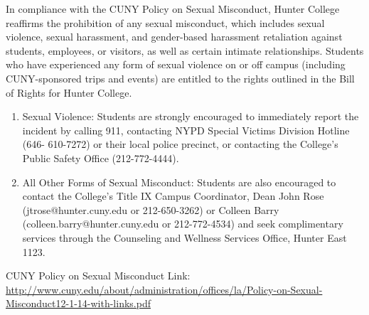 In compliance with the CUNY Policy on Sexual Misconduct, Hunter College reaffirms the prohibition of any sexual misconduct, which includes sexual violence, sexual harassment, and gender-based harassment retaliation against students, employees, or visitors, as well as certain intimate relationships. Students who have experienced any form of sexual violence on or off campus (including CUNY-sponsored trips and events) are entitled to the rights outlined in the Bill of Rights for Hunter College.
\begin{enumerate}[label=\alph*.]
    \item Sexual Violence: Students are strongly encouraged to immediately report the incident by calling 911, contacting NYPD Special Victims Division Hotline (646- 610-7272) or their local police precinct, or contacting the College’s Public Safety Office (212-772-4444).
    \item All Other Forms of Sexual Misconduct: Students are also encouraged to contact the College’s Title IX Campus Coordinator, Dean John Rose (jtrose@hunter.cuny.edu or 212-650-3262) or Colleen Barry (colleen.barry@hunter.cuny.edu or 212-772-4534) and seek complimentary services through the Counseling and Wellness Services Office, Hunter East 1123.
\end{enumerate}
CUNY Policy on Sexual Misconduct Link: \url{http://www.cuny.edu/about/administration/offices/la/Policy-on-Sexual-Misconduct12-1-14-with-links.pdf}

